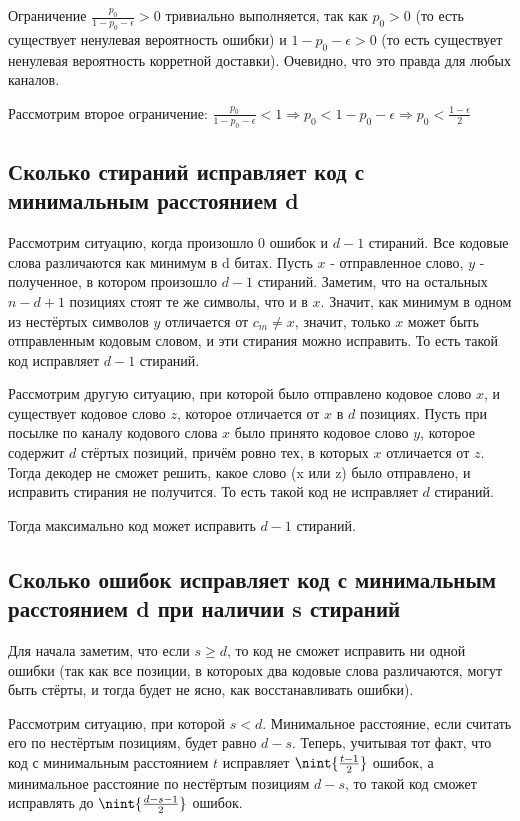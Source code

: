 \documentclass{article}
\DeclarePairedDelimiter{\nint}\lfloor\rfloor
\begin{document}
	Ограничение $\frac{p_0}{1 - p_0 - \epsilon} > 0$ тривиально выполняется, так как $p_0 > 0$ (то есть существует ненулевая вероятность ошибки) и $1 - p_0 - \epsilon > 0$ (то есть существует ненулевая вероятность корретной доставки). Очевидно, что это правда для любых каналов.
	
	Рассмотрим второе ограничение: $\frac{p_0}{1 - p_0 - \epsilon} < 1 \Rightarrow p_0 < 1 - p_0 - \epsilon \Rightarrow p_0 < \frac{1 - \epsilon}{2}$
	
	\subsection{Сколько стираний исправляет код с минимальным расстоянием d}
	
	Рассмотрим ситуацию, когда произошло 0 ошибок и $d - 1$ стираний. Все кодовые слова различаются как минимум в d битах. Пусть $x$ - отправленное слово, $y$ - полученное, в котором произошло $d - 1$ стираний. Заметим, что на остальных $n - d + 1$ позициях стоят те же символы, что и в $x$. Значит, как минимум в одном из нестёртых символов $y$ отличается от $c_m \ne x$, значит, только $x$ может быть отправленным кодовым словом, и эти стирания можно исправить. То есть такой код исправляет $d - 1$ стираний.
	
	Рассмотрим другую ситуацию, при которой было отправлено кодовое слово $x$, и существует кодовое слово $z$, которое отличается от $x$ в $d$ позициях. Пусть при посылке по каналу кодового слова $x$ было принято кодовое слово $y$, которое содержит $d$ стёртых позиций, причём ровно тех, в которых $x$ отличается от $z$. Тогда декодер не сможет решить, какое слово (x или z) было отправлено, и исправить стирания не получится. То есть такой код не исправляет $d$ стираний.
	
	Тогда максимально код может исправить $d - 1$ стираний.
	
	\subsection{Сколько ошибок исправляет код с минимальным расстоянием d при наличии s стираний}
	
	Для начала заметим, что если $s \geq d$, то код не сможет исправить ни одной ошибки (так как все позиции, в котороых два кодовые слова различаются, могут быть стёрты, и тогда будет не ясно, как восстанавливать ошибки).
	
	Рассмотрим ситуацию, при которой $s < d$. Минимальное расстояние, если считать его по нестёртым позициям, будет равно $d - s$. Теперь, учитывая тот факт, что код с минимальным расстоянием $t$ исправляет $\nint{\frac{t - 1}{2}}$ ошибок, а минимальное расстояние по нестёртым позициям $d - s$, то такой код сможет исправлять до $\nint{\frac{d - s - 1}{2}}$ ошибок.
	
\end{document}
